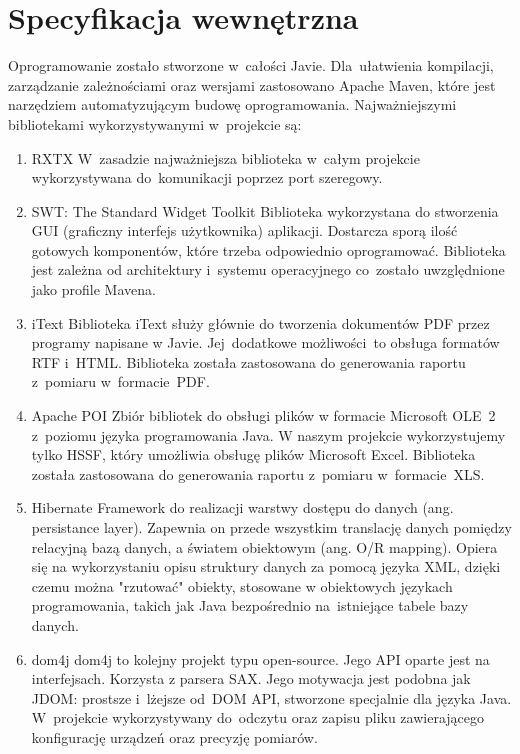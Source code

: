 \section{Specyfikacja wewnętrzna}
Oprogramowanie zostało stworzone w~całości Javie. Dla~ułatwienia kompilacji, zarządzanie zależnościami oraz wersjami zastosowano Apache Maven, które jest narzędziem automatyzującym budowę oprogramowania.
Najważniejszymi bibliotekami wykorzystywanymi w~projekcie są:
\begin{enumerate}
\item RXTX \newline
W~zasadzie najważniejsza biblioteka w~całym projekcie wykorzystywana do~komunikacji poprzez port szeregowy.
\item SWT: The Standard Widget Toolkit \newline
Biblioteka wykorzystana do stworzenia GUI (graficzny interfejs użytkownika) aplikacji. Dostarcza sporą ilość gotowych komponentów, które trzeba odpowiednio oprogramować. Biblioteka jest zależna od architektury i~systemu operacyjnego co~zostało uwzględnione jako profile Mavena.
\item iText \newline
Biblioteka iText służy głównie do tworzenia dokumentów PDF przez programy napisane w Javie. Jej~dodatkowe możliwości~to
obsługa formatów RTF i~HTML. Biblioteka została zastosowana do generowania raportu z~pomiaru w~formacie~PDF.
\item Apache POI \newline
Zbiór bibliotek do obsługi plików w formacie Microsoft OLE~2 z~poziomu języka programowania Java. W naszym projekcie wykorzystujemy tylko HSSF, który umożliwia obsługę plików Microsoft Excel. Biblioteka została zastosowana do generowania raportu z~pomiaru w~formacie~XLS.
\item Hibernate \newline
Framework do realizacji warstwy dostępu do danych (ang. persistance layer). Zapewnia on przede wszystkim translację danych pomiędzy relacyjną bazą danych, a światem obiektowym (ang. O/R mapping). Opiera się na wykorzystaniu opisu struktury danych za pomocą języka XML, dzięki czemu można "rzutować" obiekty, stosowane w obiektowych językach programowania, takich jak Java bezpośrednio na~istniejące tabele bazy danych.
\item dom4j \newline
dom4j to kolejny projekt typu open-source. Jego API oparte jest na interfejsach. Korzysta z parsera SAX. Jego motywacja jest podobna jak JDOM: prostsze i~lżejsze od~DOM API, stworzone specjalnie dla języka Java. W~projekcie wykorzystywany do~odczytu oraz zapisu pliku zawierającego konfigurację urządzeń oraz precyzję pomiarów.
\end{enumerate}
